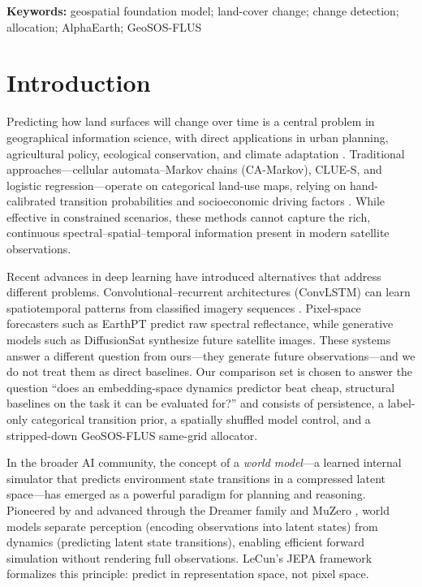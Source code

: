 \documentclass{article}
\newenvironment{keywords}{\par\noindent\textbf{Keywords:} }{\par}%
\begin{document}
\begin{keywords}
geospatial foundation model; land-cover change; change detection; allocation; AlphaEarth; GeoSOS-FLUS
\end{keywords}

\section{Introduction}
\label{sec:intro}

Predicting how land surfaces will change over time is a central problem in geographical information science, with direct applications in urban planning, agricultural policy, ecological conservation, and climate adaptation \citep{verburg2004lulc}. Traditional approaches---cellular automata--Markov chains (CA-Markov), CLUE-S, and logistic regression---operate on categorical land-use maps, relying on hand-calibrated transition probabilities and socioeconomic driving factors \citep{veldkamp2004clues}. While effective in constrained scenarios, these methods cannot capture the rich, continuous spectral--spatial--temporal information present in modern satellite observations.

Recent advances in deep learning have introduced alternatives that address different problems. Convolutional--recurrent architectures (ConvLSTM) can learn spatiotemporal patterns from classified imagery sequences \citep{shi2015convlstm}. Pixel-space forecasters such as EarthPT \citep{smith2023earthpt} predict raw spectral reflectance, while generative models such as DiffusionSat \citep{khanna2023diffusionsat} synthesize future satellite images. These systems answer a different question from ours---they generate future observations---and we do not treat them as direct baselines. Our comparison set is chosen to answer the question ``does an embedding-space dynamics predictor beat cheap, structural baselines on the task it can be evaluated for?'' and consists of persistence, a label-only categorical transition prior, a spatially shuffled model control, and a stripped-down GeoSOS-FLUS same-grid allocator.

In the broader AI community, the concept of a \textit{world model}---a learned internal simulator that predicts environment state transitions in a compressed latent space---has emerged as a powerful paradigm for planning and reasoning. Pioneered by \citet{ha2018world} and advanced through the Dreamer family \citep{hafner2023dreamerv3} and MuZero \citep{schrittwieser2020muzero}, world models separate perception (encoding observations into latent states) from dynamics (predicting latent state transitions), enabling efficient forward simulation without rendering full observations. LeCun's JEPA framework \citep{lecun2022jepa} formalizes this principle: predict in representation space, not pixel space.
\end{document}
